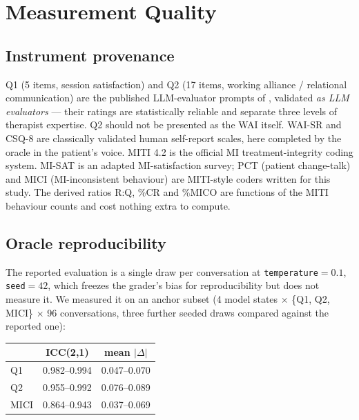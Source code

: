 \section{Measurement Quality}
\label{app:measurement}



\subsection{Instrument provenance}
Q1 (5 items, session satisfaction) and Q2 (17 items, working alliance / relational
communication) are the published LLM-evaluator prompts of \citet{yosef2024assessing}, validated
\emph{as LLM evaluators} --- their ratings are statistically reliable and separate three levels
of therapist expertise. Q2 should not be presented as the WAI itself. WAI-SR
\citep{hatcher2006waisr} and CSQ-8 \citep{larsen1979csq} are classically validated human
self-report scales, here completed by the oracle in the patient's voice. MITI 4.2
\citep{moyers2016miti} is the official MI treatment-integrity coding system. MI-SAT is an
adapted MI-satisfaction survey; PCT (patient change-talk) and MICI (MI-inconsistent behaviour)
are MITI-style coders written for this study. The derived ratios R:Q, \%CR and \%MICO are
functions of the MITI behaviour counts and cost nothing extra to compute.

\subsection{Oracle reproducibility}
The reported evaluation is a single draw per conversation at \texttt{temperature}$=0.1$,
\texttt{seed}$=42$, which freezes the grader's bias for reproducibility but does not measure
it. We measured it on an anchor subset (4 model states $\times$ \{Q1, Q2, MICI\} $\times$ 96
conversations, three further seeded draws compared against the reported one):

\begin{center}\small
\begin{tabular}{@{}lcc@{}}
\toprule
& ICC(2,1) & mean $|\Delta|$ \\
\midrule
Q1   & 0.982--0.994 & 0.047--0.070 \\
Q2   & 0.955--0.992 & 0.076--0.089 \\
MICI & 0.864--0.943 & 0.037--0.069 \\
\bottomrule
\end{tabular}
\end{center}

